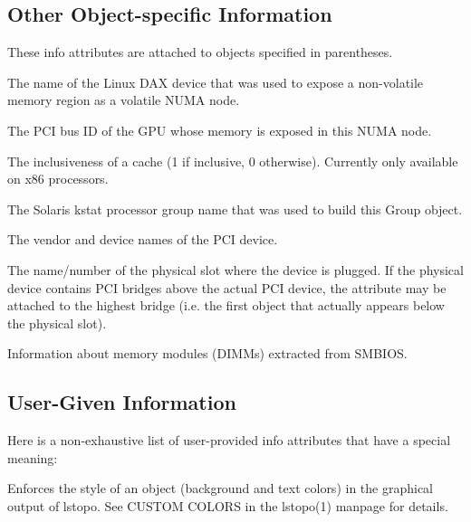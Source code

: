  \hypertarget{a00386_attributes_info_otherobjs}{}\subsection{Other Object-\/specific Information}\label{a00386_attributes_info_otherobjs}
These info attributes are attached to objects specified in parentheses.


\begin{DoxyDescription}
\item[D\+A\+X\+Device (N\+U\+MA Nodes) ]The name of the Linux D\+AX device that was used to expose a non-\/volatile memory region as a volatile N\+U\+MA node.  
\item[P\+C\+I\+Bus\+ID (G\+P\+U\+Memory N\+U\+MA Nodes) ]The P\+CI bus ID of the G\+PU whose memory is exposed in this N\+U\+MA node.  
\item[Inclusive (Caches) ]The inclusiveness of a cache (1 if inclusive, 0 otherwise). Currently only available on x86 processors.  
\item[Solaris\+Processor\+Group (Group) ]The Solaris kstat processor group name that was used to build this Group object.  
\item[P\+C\+I\+Vendor, P\+C\+I\+Device (P\+CI devices and bridges) ]The vendor and device names of the P\+CI device.  
\item[P\+C\+I\+Slot (P\+CI devices or Bridges) ]The name/number of the physical slot where the device is plugged. If the physical device contains P\+CI bridges above the actual P\+CI device, the attribute may be attached to the highest bridge (i.\+e. the first object that actually appears below the physical slot).  
\item[Vendor, Asset\+Tag, Part\+Number, Device\+Location, Bank\+Location (Memory\+Module Misc objects) ]Information about memory modules (D\+I\+M\+Ms) extracted from S\+M\+B\+I\+OS.  
\end{DoxyDescription}

 \hypertarget{a00386_attributes_info_user}{}\subsection{User-\/\+Given Information}\label{a00386_attributes_info_user}
Here is a non-\/exhaustive list of user-\/provided info attributes that have a special meaning\+: 
\begin{DoxyDescription}
\item[lstopo\+Style ]Enforces the style of an object (background and text colors) in the graphical output of lstopo. See C\+U\+S\+T\+OM C\+O\+L\+O\+RS in the lstopo(1) manpage for details.  
\end{DoxyDescription}